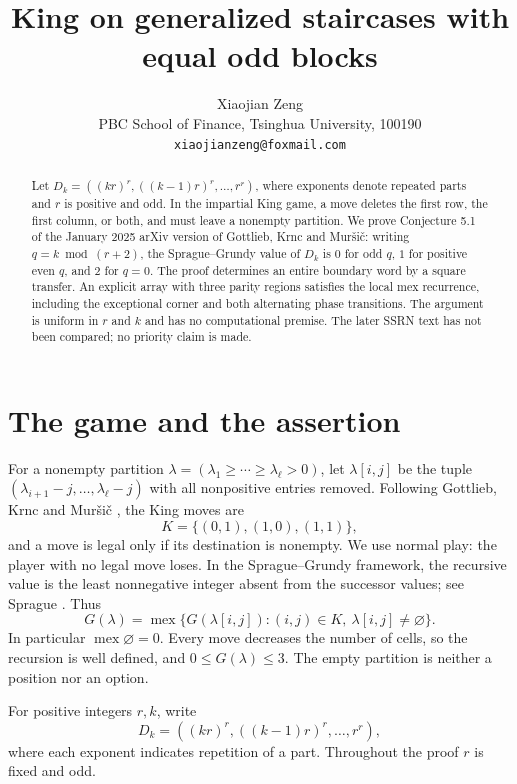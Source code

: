 \documentclass[11pt]{article}
\title{King on generalized staircases with equal odd blocks}
\author{Xiaojian Zeng\\[2pt]
\small PBC School of Finance, Tsinghua University, 100190\\
\small\texttt{xiaojianzeng@foxmail.com}}
\date{}
\theoremstyle{remark}
\DeclareMathOperator{\mex}{mex}
\begin{document}
\maketitle
\begin{abstract}
Let $D_k=((kr)^r,((k-1)r)^r,\ldots,r^r)$, where exponents denote
repeated parts and $r$ is positive and odd. In the impartial King game,
a move deletes the first row, the first column, or both, and must leave
a nonempty partition. We prove Conjecture 5.1 of the January 2025 arXiv
version of Gottlieb, Krnc and Mur\v si\v c: writing $q=k\bmod(r+2)$,
the Sprague--Grundy value of $D_k$ is $0$ for odd $q$, $1$ for positive
even $q$, and $2$ for $q=0$. The proof determines an entire boundary
word by a square transfer. An explicit array with three parity regions
satisfies the local mex recurrence, including the exceptional corner
and both alternating phase transitions. The argument is uniform in $r$
and $k$ and has no computational premise. The later SSRN text has not
been compared; no priority claim is made.
\end{abstract}

\section{The game and the assertion}

For a nonempty partition $\lambda=(\lambda_1\geq\cdots\geq\lambda_\ell>0)$,
let $\lambda[i,j]$ be the tuple
$(\lambda_{i+1}-j,\ldots,\lambda_\ell-j)$ with all nonpositive entries
removed. Following Gottlieb, Krnc and Mur\v si\v c
\cite[Definitions 2.1 and 3.1]{gkm2025}, the King moves are
\[
 K=\{(0,1),(1,0),(1,1)\},
\]
and a move is legal only if its destination is nonempty. We use normal
play: the player with no legal move loses. In the Sprague--Grundy
framework, the recursive value is the least nonnegative integer absent
from the successor values; see Sprague \cite[Section 6, Satz I]{sprague1935}.
Thus
\begin{equation}\label{eq:game}
 G(\lambda)=\mex\{G(\lambda[i,j]):(i,j)\in K,
                                      \ \lambda[i,j]\ne\varnothing\}.
\end{equation}
In particular $\mex\varnothing=0$. Every move decreases the number of
cells, so the recursion is well defined, and $0\leq G(\lambda)\leq3$.
The empty partition is neither a position nor an option.

For positive integers $r,k$, write
\[
 D_k=((kr)^r,((k-1)r)^r,\ldots,r^r),
\]
where each exponent indicates repetition of a part. Throughout the
proof $r$ is fixed and odd.
\end{document}
